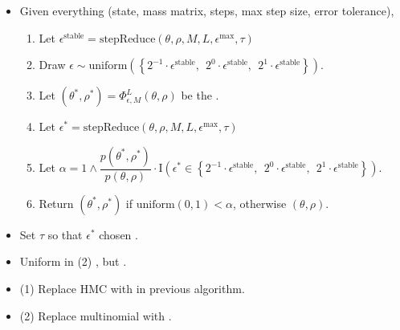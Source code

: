 \documentclass[10pt]{report}
\begin{document}
\begin{itemize}
\item Given everything (state, mass matrix, steps, max step size, error tolerance),
  \begin{enumerate}
  \item Let $\epsilon^\text{stable} = \text{stepReduce}(\theta, \rho, M, L, \epsilon^\text{max}, \tau)$
  \item Draw $\epsilon \sim \textrm{uniform}\!\left(\left\{ 2^{-1} \cdot \epsilon^\text{stable}, \ \ 2^{0} \cdot \epsilon^\text{stable}, \ \ 2^{1} \cdot \epsilon^\text{stable}\right\}\right).$
  \item Let $(\theta^*, \rho^*) = \Phi^L_{\epsilon, M}(\theta, \rho)$ be the .
  \item Let $\epsilon^* = \text{stepReduce}(\theta, \rho, M, L, \epsilon^\text{max}, \tau)$
  \item Let $\alpha = 1 \wedge \dfrac{p(\theta^*, \rho^*)}{p(\theta, \rho)}
    \cdot
    \textrm{I}\!\left(\epsilon^* \in
      \left\{ 2^{-1} \cdot \epsilon^\text{stable}, \ \ 2^{0} \cdot \epsilon^\text{stable}, \ \ 2^{1} \cdot \epsilon^\text{stable}\right\}
    \right).$
    \item Return $(\theta^*, \rho^*)$ if $\textrm{uniform}(0, 1) < \alpha$, otherwise $(\theta, \rho)$.
    \end{enumerate}
  \item Set $\tau$ so that  $\epsilon^*$ chosen .
  \item Uniform in (2) , but .
\end{itemize}

\begin{itemize}
\item (1) Replace HMC with  in previous algorithm.
\item (2) Replace multinomial with . 
\end{itemize}
\end{document}
